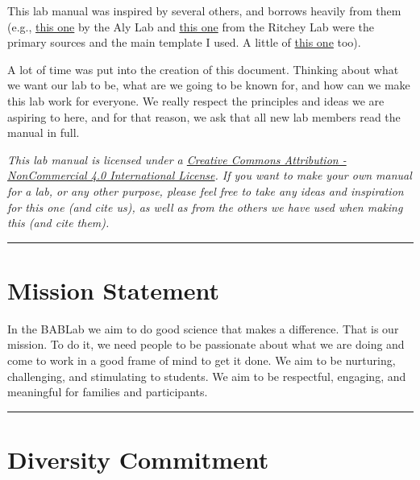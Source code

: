 \documentclass[]{book}
\begin{document}
This lab manual was inspired by several others, and borrows heavily from them (e.g., \href{https://github.com/alylab/labmanual/blob/master/aly-lab-manual.pdf}{this one} by the Aly Lab and \href{https://github.com/memobc/memolab-manual}{this one} from the Ritchey Lab were the primary sources and the main template I used. A little of \href{https://github.com/jpeelle/peellelab_manual/blob/master/peellelab_manual.pdf}{this one} too).

A lot of time was put into the creation of this document. Thinking about what we want our lab to be, what are we going to be known for, and how can we make this lab work for everyone. We really respect the principles and ideas we are aspiring to here, and for that reason, we ask that all new lab members read the manual in full.

\emph{This lab manual is licensed under a \href{https://creativecommons.org/licenses/by-nc/4.0/}{Creative Commons Attribution - NonCommercial 4.0 International License}. If you want to make your own manual for a lab, or any other purpose, please feel free to take any ideas and inspiration for this one (and cite us), as well as from the others we have used when making this (and cite them).}

\begin{center}\rule{0.5\linewidth}{0.5pt}\end{center}

\hypertarget{mission-statement}{%
\section{Mission Statement}\label{mission-statement}}

In the BABLab we aim to do good science that makes a difference. That is our mission. To do it, we need people to be passionate about what we are doing and come to work in a good frame of mind to get it done. We aim to be nurturing, challenging, and stimulating to students. We aim to be respectful, engaging, and meaningful for families and participants.

\begin{center}\rule{0.5\linewidth}{0.5pt}\end{center}

\hypertarget{diversity-commitment}{%
\section{Diversity Commitment}\label{diversity-commitment}}
\end{document}

